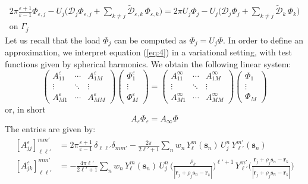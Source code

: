 \documentclass[12pt,letterpaper,oneside]{article}
\theoremstyle{definition}
\begin{document}
\begin{multline}\label{eq:4}
2\pi \frac{\varepsilon + 1}{\varepsilon - 1}\Phi_{\varepsilon,j} - U_j \bigg( {\mathcal{D}}_j \Phi_{\varepsilon,j} + \sum_{k \ne j} \tilde{\mathcal{D}}_{\varepsilon,k} \, \Phi_{\varepsilon,k}  \bigg) = 2 \pi U_j \Phi_j - U_j \bigg( {\mathcal{D}}_j \Phi_{j} + \sum_{k \ne j} \tilde{\mathcal{D}}_{k} \, \Phi_{k}  \bigg) \\ \text{on }\Gamma_j
\end{multline}
Let us recall that the load $\Phi_j$ can be computed as $\Phi_j = U_j \Phi$. In order to define an approximation, we interpret equation (\ref{eq:4}) in a variational setting, with test functions given by spherical harmonics. We obtain the following linear system:
\[
\begin{pmatrix}
A_{11}^\varepsilon	& \cdots 	& A_{1M}^\varepsilon  \\
\vdots 			& \ddots 	& \vdots \\
A_{M1}^\varepsilon 	& \cdots 	& A_{MM}^\varepsilon
\end{pmatrix}
\begin{pmatrix}
\Phi_1^\varepsilon \\ \vdots \\ \Phi_M^\varepsilon
\end{pmatrix}
=
\begin{pmatrix}
A_{11}^\infty	& \cdots 	& A_{1M}^\infty  \\
\vdots 		& \ddots 	& \vdots \\
A_{M1}^\infty 	& \cdots 	& A_{MM}^\infty
\end{pmatrix}
\begin{pmatrix}
\Phi_1 \\ \vdots \\ \Phi_M
\end{pmatrix}
\]
or, in short
\[
A_\varepsilon \Phi_\varepsilon = A_\infty \Phi
\]
The entries are given by:
\begin{align*}
{[A_{jj}^\varepsilon]}_{\ell \ell'}^{mm'}& = 2\pi \frac{\varepsilon + 1}{\varepsilon - 1}\, \delta_{\ell \ell'} \delta_{m m'} - \frac{2\pi}{2 \ell' + 1} \sum_n w_n \,Y_\ell^m(\boldsymbol{s}_n) \, U_j^n \, Y_{\ell'}^{m'}(\boldsymbol{s}_n) \\
{[A_{jk}^\varepsilon]}_{\ell \ell'}^{mm'}& = -  \frac{4 \pi \ell'}{2 \ell'+1} \sum_n w_n \, Y_\ell^m(\boldsymbol{s}_n) \, U_j^n \, \bigg( \frac{\rho_k}{|\boldsymbol{r}_j + \rho_j \boldsymbol{s}_n - \boldsymbol{r}_k|} \bigg)^{\ell'+1} \, Y_{\ell'}^{m'} \bigg( \frac{\boldsymbol{r}_j + \rho_j \boldsymbol{s}_n - \boldsymbol{r}_k}{|\boldsymbol{r}_j + \rho_j \boldsymbol{s}_n - \boldsymbol{r}_k|} \bigg)
\end{align*}
\end{document}
